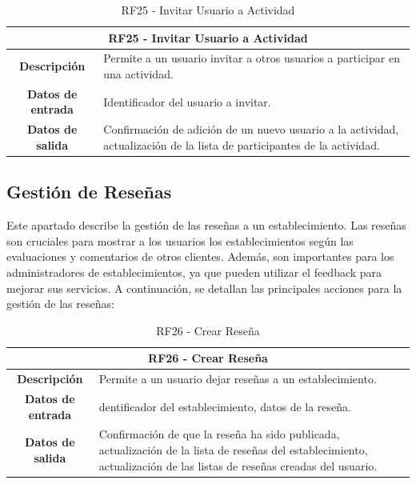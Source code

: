 \begin{table}[H]
    \centering
    \begin{tabular}{|c|p{10cm}|}
        \hline
        \multicolumn{2}{|c|}{\textbf{RF25 - Invitar Usuario a Actividad}}                                                                                   \\
        \hline
        \textbf{Descripción}      & Permite a un usuario invitar a otros usuarios a participar en una actividad.                                            \\
        \hline
        \textbf{Datos de entrada} & Identificador del usuario a invitar.                                                                                    \\
        \hline
        \textbf{Datos de salida}  & Confirmación de adición de un nuevo usuario a la actividad, actualización de la lista de participantes de la actividad. \\
        \hline
    \end{tabular}
    \caption{RF25 - Invitar Usuario a Actividad}
\end{table}

\subsection{Gestión de Reseñas}

Este apartado describe la gestión de las reseñas a un establecimiento. Las reseñas son cruciales para mostrar a los usuarios los establecimientos según las evaluaciones y comentarios de otros clientes. Además, son importantes para los administradores de establecimientos, ya que pueden utilizar el feedback para mejorar sus servicios. A continuación, se detallan las principales acciones para la gestión de las reseñas:

\begin{table}[H]
    \centering
    \begin{tabular}{|c|p{10cm}|}
        \hline
        \multicolumn{2}{|c|}{\textbf{RF26 - Crear Reseña}}                                                                                                                                                 \\
        \hline
        \textbf{Descripción}      & Permite a un usuario dejar reseñas a un establecimiento.                                                                                                               \\
        \hline
        \textbf{Datos de entrada} & dentificador del establecimiento, datos de la reseña.                                                                                                                  \\
        \hline
        \textbf{Datos de salida}  & Confirmación de que la reseña ha sido publicada, actualización de la lista de reseñas del establecimiento, actualización de las listas de reseñas creadas del usuario. \\
        \hline
    \end{tabular}
    \caption{RF26 - Crear Reseña}
\end{table}

